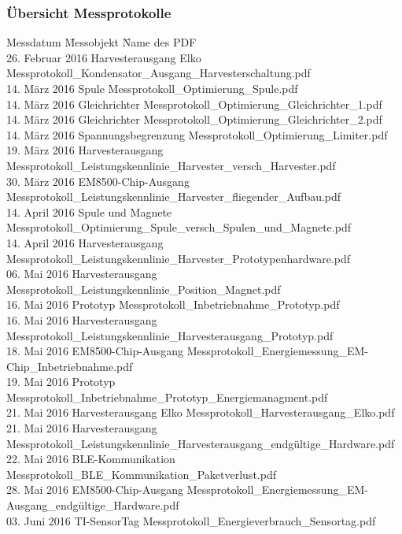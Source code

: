 \subsubsection*{Übersicht Messprotokolle  }
\label{tabelle_uebersicht_messprotokolle}
\begin{tabbing}
       Messdatum	   	\quad\= Messobjekt    		\quad\= Name des PDF     \\[0.8ex]
	   26. Februar 2016 \> Harvesterausgang Elko 	\> Messprotokoll\_Kondensator\_Ausgang\_Harvesterschaltung.pdf\\
	   14. März 2016 	\> Spule 					\> Messprotokoll\_Optimierung\_Spule.pdf\\
	   14. März 2016 	\> Gleichrichter 			\> Messprotokoll\_Optimierung\_Gleichrichter\_1.pdf\\
	   14. März 2016 	\> Gleichrichter 			\> Messprotokoll\_Optimierung\_Gleichrichter\_2.pdf\\
	   14. März 2016 	\> Spannungsbegrenzung 		\> Messprotokoll\_Optimierung\_Limiter.pdf\\
	   19. März 2016 	\> Harvesterausgang 		\> Messprotokoll\_Leistungskennlinie\_Harvester\_versch\_Harvester.pdf\\
	   30. März 2016 	\> EM8500-Chip-Ausgang 		\> Messprotokoll\_Leistungskennlinie\_Harvester\_fliegender\_Aufbau.pdf\\
	   14. April 2016 	\> Spule und Magnete 		\> Messprotokoll\_Optimierung\_Spule\_versch\_Spulen\_und\_Magnete.pdf\\
	   14. April 2016 	\> Harvesterausgang 		\> Messprotokoll\_Leistungskennlinie\_Harvester\_Prototypenhardware.pdf\\
	   06. Mai 2016 	\> Harvesterausgang 		\> Messprotokoll\_Leistungskennlinie\_Position\_Magnet.pdf\\
	   16. Mai 2016 	\> Prototyp 				\> Messprotokoll\_Inbetriebnahme\_Prototyp.pdf\\
	   16. Mai 2016 	\> Harvesterausgang 		\> Messprotokoll\_Leistungskennlinie\_Harvesterausgang\_Prototyp.pdf\\
       18. Mai 2016 	\> EM8500-Chip-Ausgang 		\> Messprotokoll\_Energiemessung\_EM-Chip\_Inbetriebnahme.pdf\\	   
	   19. Mai 2016 	\> Prototyp 				\> Messprotokoll\_Inbetriebnahme\_Prototyp\_Energiemanagment.pdf\\
	   21. Mai 2016 	\> Harvesterausgang Elko 	\> Messprotokoll\_Harvesterausgang\_Elko.pdf\\
	   21. Mai 2016 	\> Harvesterausgang 		\> Messprotokoll\_Leistungskennlinie\_Harvesterausgang\_endgültige\_Hardware.pdf\\
	   22. Mai 2016 	\> BLE-Kommunikation 		\> Messprotokoll\_BLE\_Kommunikation\_Paketverlust.pdf\\ %
	   28. Mai 2016 	\> EM8500-Chip-Ausgang 		\> Messprotokoll\_Energiemessung\_EM-Ausgang\_endgültige\_Hardware.pdf\\ %
	   03. Juni 2016 	\> TI-SensorTag 			\> Messprotokoll\_Energieverbrauch\_Sensortag.pdf\\
\end{tabbing}  
